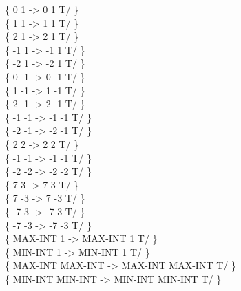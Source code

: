 \begin{tt}
\{       0       1 \word{/} ->       0       1 T/ \} \\
\{       1       1 \word{/} ->       1       1 T/ \} \\
\{       2       1 \word{/} ->       2       1 T/ \} \\
\{      -1       1 \word{/} ->      -1       1 T/ \} \\
\{      -2       1 \word{/} ->      -2       1 T/ \} \\
\{       0      -1 \word{/} ->       0      -1 T/ \} \\
\{       1      -1 \word{/} ->       1      -1 T/ \} \\
\{       2      -1 \word{/} ->       2      -1 T/ \} \\
\{      -1      -1 \word{/} ->      -1      -1 T/ \} \\
\{      -2      -1 \word{/} ->      -2      -1 T/ \} \\
\{       2       2 \word{/} ->       2       2 T/ \} \\
\{      -1      -1 \word{/} ->      -1      -1 T/ \} \\
\{      -2      -2 \word{/} ->      -2      -2 T/ \} \\
\{       7       3 \word{/} ->       7       3 T/ \} \\
\{       7      -3 \word{/} ->       7      -3 T/ \} \\
\{      -7       3 \word{/} ->      -7       3 T/ \} \\
\{      -7      -3 \word{/} ->      -7      -3 T/ \} \\
\{ MAX-INT       1 \word{/} -> MAX-INT       1 T/ \} \\
\{ MIN-INT       1 \word{/} -> MIN-INT       1 T/ \} \\
\{ MAX-INT MAX-INT \word{/} -> MAX-INT MAX-INT T/ \} \\
\{ MIN-INT MIN-INT \word{/} -> MIN-INT MIN-INT T/ \}


\end{tt}
